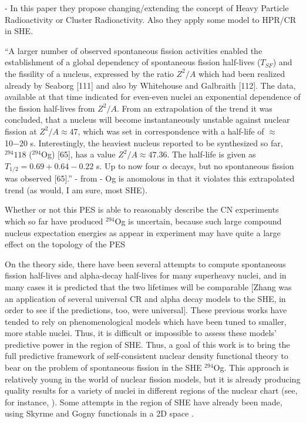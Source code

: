 \cite{Poenaru2011, Poenaru2012} - In this paper they propose changing/extending the concept of Heavy Particle Radioactivity or Cluster Radioactivity. Also they apply some model to HPR/CR in SHE.

``A larger number of observed spontaneous fission activities enabled the establishment of a global dependency of spontaneous fission half-lives ($T_{SF}$) and the fissility of a nucleus, expressed by the ratio $Z^2/A$ which had been realized already by Seaborg [111] and also by Whitehouse and Galbraith [112]. The data, available at that time indicated for even-even nuclei an exponential dependence of the fission half-lives from $Z^2/A$. From an extrapolation of the trend it was concluded, that a nucleus will become instantaneously unstable against nuclear fission at $Z^2/A \approx 47$, which was set in correspondence with a half-life of $\approx$ 10−20 s. Interestingly, the heaviest nucleus reported to be synthesized so far, $^{294}118$ ($^{294}$Og) [65], has a value $Z^2/A \approx 47.36$. The half-life is given as $T_{1/2} =0.69+0.64−0.22$ s. Up to now four $\alpha$ decays, but no spontaneous fission was observed [65].'' - from \cite{Heßberger2017} - Og is anomolous in that it violates this extrapolated trend (as would, I am sure, most SHE).

Whether or not this PES is able to reasonably describe the CN experiments which so far have produced $^{294}$Og is uncertain, because such large compound nucleus expectation energies as appear in experiment may have quite a large effect on the topology of the PES \cite{Pei2009}

On the theory side, there have been several attempts to compute spontaneous fission half-lives and alpha-decay half-lives for many superheavy nuclei, and in many cases it is predicted that the two lifetimes will be comparable \cite{Poenaru2011, Poenaru2012, Zhang2018} [Zhang was an application of several universal CR and alpha decay models to the SHE, in order to see if the predictions, too, were universal]. These previous works have tended to rely on phenomenological models which have been tuned to smaller, more stable nuclei. Thus, it is difficult or impossible to assess these models' predictive power in the region of SHE. Thus, a goal of this work is to bring the full predictive framework of self-consistent nuclear density functional theory to bear on the problem of spontaneous fission in the SHE $^{294}$Og. This approach is relatively young in the world of nuclear fission models, but it is already producing quality results for a variety of nuclei in different regions of the nuclear chart (see, for instance, \cite{Mcdonnell2014, Sadhukhan2017, Sadhukhan2016, Tsekhanovich2018}). Some attempts in the region of SHE have already been made, using Skyrme and Gogny functionals in a 2D space \cite{Reinhard2017, Giuliani2017, Warda2012, Baran2015}.

